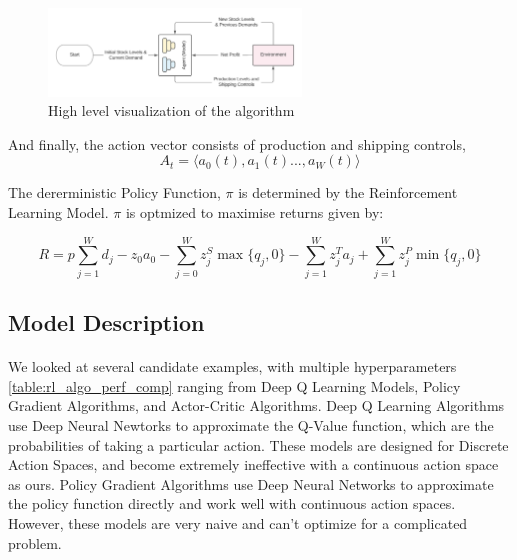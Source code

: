 \documentclass{article}
\begin{document}
\begin{figure}[h]
    \centering
    \includegraphics[width=0.6\textwidth]{RL.png}
    \caption{High level visualization of the algorithm}
\end{figure}

And finally, the action vector consists of production and shipping controls,
\begin{equation}
    A_t = \langle a_0(t), a_1(t) ..., a_W(t) \rangle \label{eq:action_fmt}
\end{equation}

The dererministic Policy Function, \( \pi \) is determined by the Reinforcement Learning Model. \( \pi \) is optmized to maximise returns given by:

\begin{equation}
    R = p\sum_{j = 1}^Wd_j - z_0a_0 - \sum_{j = 0}^W z_j^S \max \{q_j, 0 \} - \sum_{j = 1}^W z_j^Ta_j + \sum_{j = 1}^Wz_j^P \min \{q_j, 0 \}
\end{equation}

\subsection{Model Description}

\paragraph{}

We looked at several candidate examples, with multiple hyperparameters \ref{table:rl_algo_perf_comp} ranging from Deep Q Learning Models, Policy Gradient Algorithms, and Actor-Critic Algorithms. Deep Q Learning Algorithms use Deep Neural Newtorks to approximate the Q-Value function, which are the probabilities of taking a particular action. These models are designed for Discrete Action Spaces, and become extremely ineffective with a continuous action space as ours. Policy Gradient Algorithms use Deep Neural Networks to approximate the policy function directly and work well with continuous action spaces. However, these models are very naive and can't optimize for a complicated problem.
\end{document}
